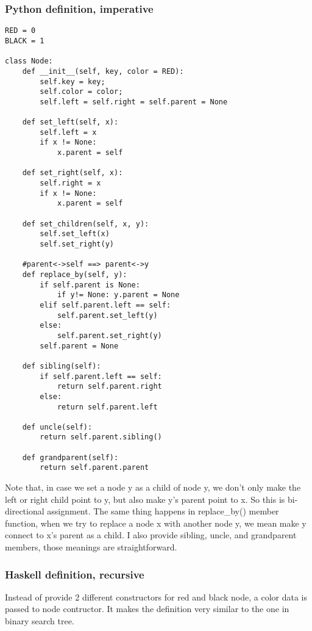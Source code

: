 \documentclass{article}
\begin{document}
\subsubsection*{Python definition, imperative}
\lstset{language=python}
\begin{lstlisting}
RED = 0
BLACK = 1

class Node:
    def __init__(self, key, color = RED):
        self.key = key;
        self.color = color;
        self.left = self.right = self.parent = None

    def set_left(self, x):
        self.left = x
        if x != None:
            x.parent = self

    def set_right(self, x):
        self.right = x
        if x != None:
            x.parent = self

    def set_children(self, x, y):
        self.set_left(x)
        self.set_right(y)

    #parent<->self ==> parent<->y
    def replace_by(self, y):    
        if self.parent is None:
            if y!= None: y.parent = None
        elif self.parent.left == self:
            self.parent.set_left(y)
        else:
            self.parent.set_right(y)
        self.parent = None

    def sibling(self):
        if self.parent.left == self:
            return self.parent.right
        else:
            return self.parent.left

    def uncle(self):
        return self.parent.sibling()

    def grandparent(self):
        return self.parent.parent
\end{lstlisting}

Note that, in case we set a node y as a child of node y, we don't only
make the left or right child point to y, but also make y's parent point to x.
So this is bi-directional assignment. The same thing happens in replace\_by()
member function, when we try to replace a node x with another node y, we
mean make y connect to x's parent as a child. I also provide sibling, uncle,
and grandparent members, those meanings are straightforward.

\subsubsection*{Haskell definition, recursive}
Instead of provide 2 different constructors for red and black node, a color
data is passed to node contructor. It makes the definition very similar to the 
one in binary search tree.
\end{document}

